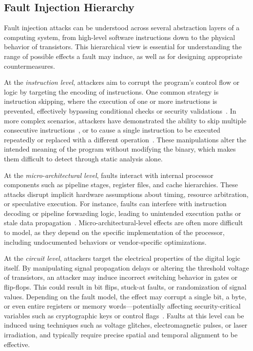 \subsection{Fault Injection Hierarchy}
Fault injection attacks can be understood across several abstraction layers of a computing system, from high-level software instructions down to the physical behavior of transistors. This hierarchical view is essential for understanding the range of possible effects a fault may induce, as well as for designing appropriate countermeasures.

At the \textit{instruction level}, attackers aim to corrupt the program’s control flow or logic by targeting the encoding of instructions. One common strategy is instruction skipping, where the execution of one or more instructions is prevented, effectively bypassing conditional checks or security validations~\cite{alshaer2022cross, dehbaoui2013electromagnetic}. In more complex scenarios, attackers have demonstrated the ability to skip multiple consecutive instructions~\cite{riviere2015high, nashimoto2017buffer}, or to cause a single instruction to be executed repeatedly or replaced with a different operation~\cite{khuat2021laser, alshaer2022variable, balasch2011depth, timmers2016controlling}. These manipulations alter the intended meaning of the program without modifying the binary, which makes them difficult to detect through static analysis alone.

At the \textit{micro-architectural level}, faults interact with internal processor components such as pipeline stages, register files, and cache hierarchies. These attacks disrupt implicit hardware assumptions about timing, resource arbitration, or speculative execution. For instance, faults can interfere with instruction decoding or pipeline forwarding logic, leading to unintended execution paths or stale data propagation~\cite{Tollec2022exploration}. Micro-architectural-level effects are often more difficult to model, as they depend on the specific implementation of the processor, including undocumented behaviors or vendor-specific optimizations.

At the \textit{circuit level}, attackers target the electrical properties of the digital logic itself. By manipulating signal propagation delays or altering the threshold voltage of transistors, an attacker may induce incorrect switching behavior in gates or flip-flops. This could result in bit flips, stuck-at faults, or randomization of signal values. Depending on the fault model, the effect may corrupt a single bit, a byte, or even entire registers or memory words—potentially affecting security-critical variables such as cryptographic keys or control flags~\cite{barenghi2012fault, marc2012fault}. Faults at this level can be induced using techniques such as voltage glitches, electromagnetic pulses, or laser irradiation, and typically require precise spatial and temporal alignment to be effective.

